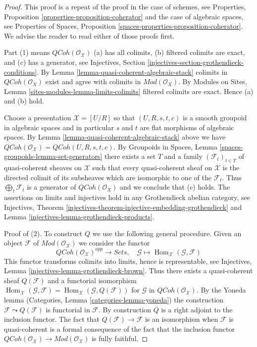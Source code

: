 \documentclass[10pt,a4paper]{amsart}
\theoremstyle{plain}
\theoremstyle{definition}
\theoremstyle{remark}
\numberwithin{equation}{subsection}
\def\Hom{\mathop{\mathrm{Hom}}\nolimits}
\def\QCoh{\mathit{QCoh}}
\begin{document}
\begin{proof}
This proof is a repeat of the proof in the case of schemes, see
Properties, Proposition \ref{properties-proposition-coherator}
and the case of algebraic spaces, see
Properties of Spaces, Proposition
\ref{spaces-properties-proposition-coherator}.
We advise the reader to read either of those proofs first.

\medskip\noindent
Part (1) means $\QCoh(\mathcal{O}_\mathcal{X})$ (a) has all colimits,
(b) filtered colimits are exact, and (c) has a generator, see
Injectives, Section \ref{injectives-section-grothendieck-conditions}.
By Lemma \ref{lemma-quasi-coherent-algebraic-stack}
colimits in $\QCoh(\mathcal{O}_X)$ exist and agree
with colimits in $\textit{Mod}(\mathcal{O}_X)$. By
Modules on Sites, Lemma \ref{sites-modules-lemma-limits-colimits}
filtered colimits are exact. Hence (a) and (b) hold.

\medskip\noindent
Choose a presentation $\mathcal{X} = [U/R]$ so that $(U, R, s, t, c)$
is a smooth groupoid in algebraic spaces and in particular $s$ and $t$
are flat morphisms of algebraic spaces. By
Lemma \ref{lemma-quasi-coherent-algebraic-stack}
above we have
$\QCoh(\mathcal{O}_\mathcal{X}) = \QCoh(U, R, s, t, c)$.
By Groupoids in Spaces, Lemma \ref{spaces-groupoids-lemma-set-generators}
there exists a set $T$ and a family $(\mathcal{F}_t)_{t \in T}$ of
quasi-coherent sheaves on $\mathcal{X}$ such that every quasi-coherent
sheaf on $\mathcal{X}$ is the directed colimit of its subsheaves
which are isomorphic to one of the $\mathcal{F}_t$.
Thus $\bigoplus_t \mathcal{F}_t$ is
a generator of $\QCoh(\mathcal{O}_X)$ and we conclude that (c) holds.
The assertions on limits and injectives hold in any
Grothendieck abelian category, see
Injectives, Theorem
\ref{injectives-theorem-injective-embedding-grothendieck} and
Lemma \ref{injectives-lemma-grothendieck-products}.

\medskip\noindent
Proof of (2). To construct $Q$ we use the following general procedure.
Given an object $\mathcal{F}$ of $\textit{Mod}(\mathcal{O}_\mathcal{X})$
we consider the functor
$$
\QCoh(\mathcal{O}_\mathcal{X})^{opp}
\longrightarrow
\textit{Sets},
\quad
\mathcal{G}
\longmapsto
\Hom_\mathcal{X}(\mathcal{G}, \mathcal{F})
$$
This functor transforms colimits into limits,
hence is representable, see
Injectives, Lemma \ref{injectives-lemma-grothendieck-brown}.
Thus there exists a quasi-coherent sheaf $Q(\mathcal{F})$
and a functorial isomorphism
$\Hom_\mathcal{X}(\mathcal{G}, \mathcal{F}) =
\Hom_\mathcal{X}(\mathcal{G}, Q(\mathcal{F}))$
for $\mathcal{G}$ in $\QCoh(\mathcal{O}_\mathcal{X})$.
By the Yoneda lemma
(Categories, Lemma \ref{categories-lemma-yoneda})
the construction $\mathcal{F} \leadsto Q(\mathcal{F})$ is
functorial in $\mathcal{F}$. By construction $Q$ is a right
adjoint to the inclusion functor.
The fact that $Q(\mathcal{F}) \to \mathcal{F}$ is an isomorphism
when $\mathcal{F}$ is quasi-coherent is a formal consequence of the fact
that the inclusion functor
$\QCoh(\mathcal{O}_\mathcal{X}) \to
\textit{Mod}(\mathcal{O}_\mathcal{X})$
is fully faithful.
\end{proof}
\end{document}
